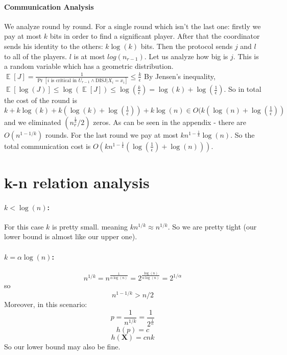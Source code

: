 \documentclass{article}
\newcommand{\rv}[1]{\mathbf{#1}}
\theoremstyle{plain}
\begin{document}
\paragraph{Communication Analysis}
We analyze round by round. \newline
For a single round which isn't the last one: firstly we pay at most $k$ bits in order to find a significant player. After that the coordinator sends his identity to the others: $k\log(k)$ bits. Then the protocol sends $j$ and $l$ to all of the players. $l$ is at most $log(n_{r-1})$. Let us analyze how big is $j$. \newline
This is a random variable which has a geometric distribution. \newline
$ \mathop{\mathbb{E}} [J] = \frac{1}{\Pr[\text{$i$ is critical in $U_{r-1}$} \land \text{DISJ} | X_i = x_i]} \leq \frac{k}{\epsilon}$ \newline
By Jensen's inequality, $\mathop{\mathbb{E}} [\log(J)] \leq \log(\mathop{\mathbb{E}} [J]) \leq \log(\frac{k}{\epsilon}) = \log(k) + \log(\frac{1}{\epsilon})$.  \newline
So in total the cost of the round is $k + k\log(k) + k(\log(k) + \log(\frac{1}{\epsilon})) + k\log(n) \in O(k(\log(n) + \log(\frac{1}{\epsilon}))$ and we eliminated $(n_r^{\frac{1}{k}}/2)$ zeros. \newline
As can be seen in the appendix - there are $O(n^{1-1/k})$ rounds.
For the last round we pay at most $kn^{1-\frac{1}{k}} \log(n)$. \newline
So the total communication cost is  $O(kn^{1-\frac{1}{k}}(\log(\frac{1}{\epsilon}) + \log(n)))$.
\section{k-n relation analysis}
\paragraph{$k < \log(n)$:}
For this case $k$ is pretty small. meaning $kn^{1/k} \approx n^{1/k}$. So we are pretty tight (our lower bound is almost like our upper one).
\paragraph{$k = \alpha\log(n)$:}
\begin{equation*}
    n^{1/k} = n^{\frac{1}{\alpha\log(n)}} = 2^{\frac{\log(n)}{\alpha\log(n)}} = 2^{1/\alpha}
\end{equation*}
so
\begin{equation*}
    n^{1-1/k} > n/2
\end{equation*}
Moreover, in this scenario:
\begin{equation*}
    p = \frac{1}{n^{1/k}} = \frac{1}{2^{\frac{1}{\alpha}}} 
\end{equation*}
\begin{equation*}
    h(p) = c 
\end{equation*}
\begin{equation*}
    h(\rv{X}) = cnk
\end{equation*}
So our lower bound may also be fine.
\end{document}
